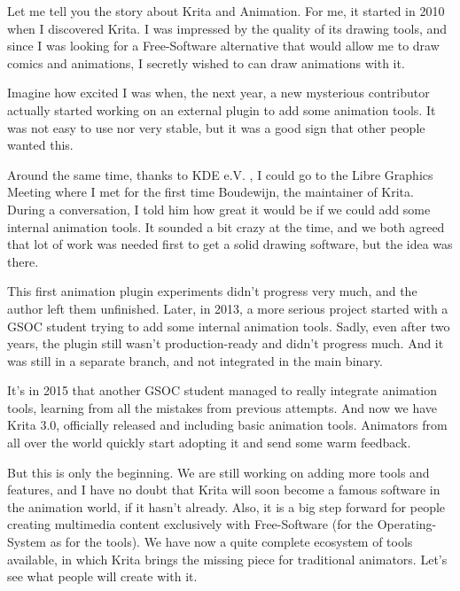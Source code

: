

\noindent{}Let me tell you the story about Krita and Animation. For me, it started in 2010 when I discovered Krita. I was impressed by the quality of its drawing tools, and since I was looking for a Free-Software alternative that would allow me to draw comics and animations, I secretly wished to can draw animations with it. 

Imagine how excited I was when, the next year, a new mysterious contributor actually started working on an external plugin to add some animation tools. It was not easy to use nor very stable, but it was a good sign that other people wanted this. 

Around the same time, thanks to KDE e.V. , I could go to the Libre Graphics Meeting where I met for the first time Boudewijn, the maintainer of Krita. During a conversation, I told him how great it would be if we could add some internal animation tools. It sounded a bit crazy at the time, and we both agreed that lot of work was needed first to get a solid drawing software, but the idea was there.

This first animation plugin experiments didn’t progress very much, and the author left them unfinished. Later, in 2013, a more serious project started with a GSOC student trying to add some internal animation tools. Sadly, even after two years, the plugin still wasn’t production-ready and didn’t progress much. And it was still in a separate branch, and not integrated in the main binary.

It’s in 2015 that another GSOC student managed to really integrate animation tools, learning from all the mistakes from previous attempts. And now we have Krita 3.0, officially released and including basic animation tools. Animators from all over the world quickly start adopting it and send some warm feedback.

But this is only the beginning. We are still working on adding more tools and features, and I have no doubt that Krita will soon become a famous software in the animation world, if it hasn’t already. Also, it is a big step forward for people creating multimedia content exclusively with Free-Software (for the Operating-System as for the tools). We have now a quite complete ecosystem of tools available, in which Krita brings the missing piece for traditional animators. Let’s see what people will create with it.

